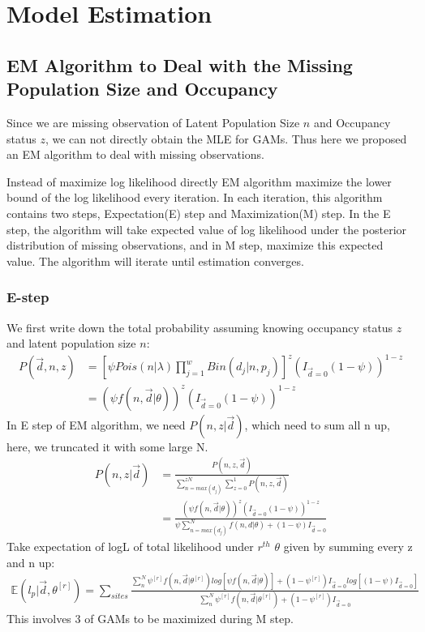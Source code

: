 \documentclass[]{article}
\begin{document}
\section{Model Estimation}
\subsection{EM Algorithm to Deal with the Missing Population Size and Occupancy}
Since we are missing observation of Latent Population Size $n$ and Occupancy status $z$, we can not directly obtain the MLE for GAMs. Thus here we proposed an EM algorithm to deal with missing observations.

Instead of maximize log likelihood directly EM algorithm maximize the lower bound of the log likelihood every iteration. In each iteration, this algorithm contains two steps, Expectation(E) step and Maximization(M) step. In the E step, the algorithm will take expected value of log likelihood under the posterior distribution of missing observations, and in M step, maximize this expected value. The algorithm will iterate until estimation converges. 

\subsubsection{E-step}
We first write down the total probability assuming knowing occupancy status $z$ and latent population size $n$:
\begin{equation}
	\begin{aligned}
	P(\vec{d},n,z)&=[\psi Pois(n|\lambda)\prod_{j=1}^{w}Bin(d_{j}|n,p_{j})]^{z}(I_{\vec{d}=0}(1-\psi))^{1-z}\\
	&=(\psi f(n,\vec{d}|\theta))^{z}(I_{\vec{d}=0}(1-\psi))^{1-z}
	\end{aligned}
\end{equation}
In E step of EM algorithm, we need $P(n,z|\vec{d})$, which need to sum all n up, here, we truncated it with some large N.
\begin{equation}
	\begin{aligned}
	P(n,z|\vec{d})&=\frac{P(n,z,\vec{d})}{\sum_{n=max(d_{j})}^{zN}\sum_{z=0}^{1}P(n,z,\vec{d})}\\
	&=\frac{(\psi f(n,\vec{d}|\theta))^{z}(I_{\vec{d}=0}(1-\psi))^{1-z}}{\psi \sum_{n=max(d_{j})}^{N}f(n,d|\theta)+(1-\psi)I_{\vec{d}=0}}
	\end{aligned}
\end{equation}
Take expectation of logL of total likelihood under $r^{th}$ $\theta$ given by summing every z and n up:
\begin{equation}
	\begin{aligned}
	\mathbb{E}(l_{p}|\vec{d},\theta^{[r]})=\sum_{sites}\frac{\sum_{n}^{N}\psi^{[r]}f(n,\vec{d}|\theta^{[r]})log[\psi f(n,\vec{d}|\theta)]+(1-\psi^{[r]})I_{\vec{d}=0}log[(1-\psi)I_{\vec{d}=0}]}{\sum_{n}^{N}\psi^{[r]}f(n,\vec{d}|\theta^{[r]})+(1-\psi^{[r]})I_{\vec{d}=0}}
	\end{aligned}
\end{equation}
This involves 3 of GAMs to be maximized during M step.
\end{document}
